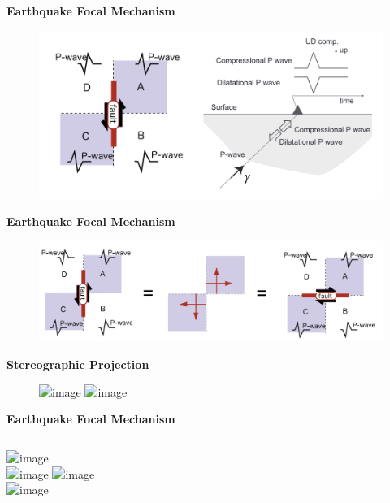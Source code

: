 \documentclass[11pt]{beamer}
\begin{document}
\begin{frame}{\textbf{Earthquake Focal Mechanism}}
    \begin{figure}
        \includegraphics[width=1\linewidth]{images/fm1}
    \end{figure}
\end{frame}
\begin{frame}{\textbf{Earthquake Focal Mechanism}}
    \begin{figure}
        \includegraphics[width=1\linewidth]{images/fm2}
    \end{figure}
\end{frame}
\begin{frame}{\textbf{Stereographic Projection}}
    \begin{figure}
        \includegraphics<1>[width=1\linewidth]{images/stereo2}
        \includegraphics<2>[width=1\linewidth]{images/stereo}
    \end{figure}
\end{frame}
\begin{frame}{\textbf{Earthquake Focal Mechanism}}
    \begin{columns}[t]
            \centering
                \includegraphics<1->[width=0.7\linewidth]{images/nfm} \\
                \includegraphics<3->[width=0.7\linewidth]{images/rfm}
            \centering
                \includegraphics<2->[width=0.7\linewidth]{images/ssfm} \\
                \includegraphics<4->[width=0.7\linewidth]{images/osfm}
    \end{columns} 
\end{frame}
\end{document}
